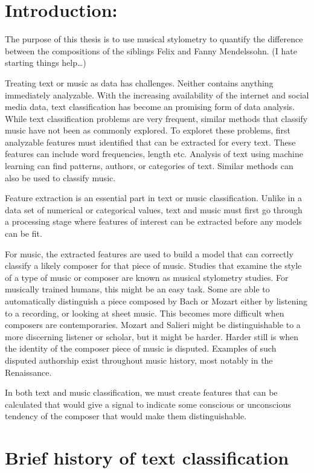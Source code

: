 \documentclass[12pt,twoside]{reedthesis}
\theoremstyle{definition}
\theoremstyle{definition}
\theoremstyle{definition}
\theoremstyle{remark}
\begin{document}
\section{Introduction:}\label{introduction}

The purpose of this thesis is to use musical stylometry to quantify the
difference between the compositions of the siblings Felix and Fanny
Mendelssohn. (I hate starting things help\ldots{})

Treating text or music as data has challenges. Neither contains anything
immediately analyzable. With the increasing availability of the internet
and social media data, text classification has become an promising form
of data analysis. While text classification problems are very frequent,
similar methods that classify music have not been as commonly explored.
To exploret these problems, first analyzable features must identified
that can be extracted for every text. These features can include word
frequencies, length etc. Analysis of text using machine learning can
find patterns, authors, or categories of text. Similar methods can also
be used to classify music.

Feature extraction is an essential part in text or music classification.
Unlike in a data set of numerical or categorical values, text and music
must first go through a processing stage where features of interest can
be extracted before any models can be fit.

For music, the extracted features are used to build a model that can
correctly classify a likely composer for that piece of music. Studies
that examine the style of a type of music or composer are known as
musical stylometry studies. For musically trained humans, this might be
an easy task. Some are able to automatically distinguish a piece
composed by Bach or Mozart either by listening to a recording, or
looking at sheet music. This becomes more difficult when composers are
contemporaries. Mozart and Salieri might be distinguishable to a more
discerning listener or scholar, but it might be harder. Harder still is
when the identity of the composer piece of music is disputed. Examples
of such disputed authorship exist throughout music history, most notably
in the Renaissance.

In both text and music classification, we must create features that can
be calculated that would give a signal to indicate some conscious or
unconscious tendency of the composer that would make them
distinguishable.

\section{Brief history of text
classification}\label{brief-history-of-text-classification}
\end{document}
